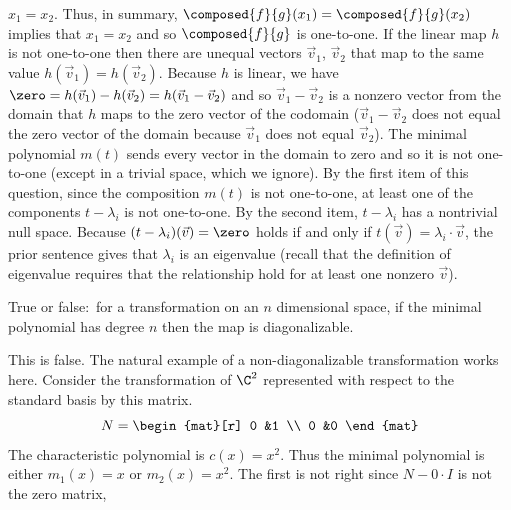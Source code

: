 \begin{exercises}
\begin{answer}
\begin{exparts}
          $x_1=x_2$.
          Thus, in summary, $\composed{f}{g}(x_1)=\composed{f}{g}(x_2)$
          implies that $x_1=x_2$ and so $\composed{f}{g}$ is one-to-one.
        \partsitem If the linear map $h$ 
          is not one-to-one then there are unequal
          vectors $\vec{v}_1$, $\vec{v}_2$ that map to the same value
          $h(\vec{v}_1)=h(\vec{v}_2)$.
          Because $h$ is linear, we have
          $\zero=h(\vec{v}_1)-h(\vec{v}_2)=h(\vec{v}_1-\vec{v}_2)$
          and so $\vec{v}_1-\vec{v}_2$ is a nonzero vector from the domain
          that $h$ maps to the zero vector of the codomain  
          ($\vec{v}_1-\vec{v}_2$
          does not equal the zero vector of the domain because $\vec{v}_1$
          does not equal $\vec{v}_2$).
        \partsitem The minimal polynomial 
          $m(t)$ sends every vector in the domain to 
          zero and so it is not one-to-one (except in a trivial space, which 
          we ignore).
          By the first item of this question, 
          since the composition $m(t)$ is not one-to-one, 
          at least one of the components $t-\lambda_i$ is not one-to-one.
          By the second item, $t-\lambda_i$ has a nontrivial null space.
          Because $(t-\lambda_i)(\vec{v})=\zero$ holds if and only if
          $t(\vec{v})=\lambda_i\cdot\vec{v}$, the prior sentence gives that
          $\lambda_i$ is an eigenvalue (recall that the definition of
          eigenvalue requires that the relationship hold for at least one
          nonzero $\vec{v}$).
      \end{exparts}
    \end{answer}
  \item 
    True or false:~for a transformation on an
    \( n \) dimensional space, if the minimal polynomial has degree \( n \) 
    then the map is diagonalizable.
    \begin{answer}
      This is false.
      The natural example of a non-diagonalizable transformation works here.
      Consider the transformation of $\C^2$ represented with respect to
      the standard basis by this matrix.
      \begin{equation*}
        N=
        \begin{mat}[r]
          0  &1  \\
          0  &0
        \end{mat}
      \end{equation*}
      The characteristic polynomial is $c(x)=x^2$. 
      Thus the minimal polynomial is either $m_1(x)=x$ or $m_2(x)=x^2$.
      The first is not right since $N-0\cdot I$ is not the zero matrix,

\end{answer}
\end{exercises}
